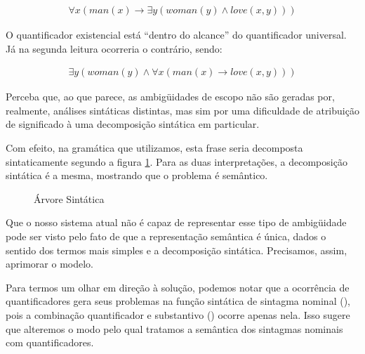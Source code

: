 \begin{align*}
\forall x (man(x) \rightarrow \exists y (woman(y) \land love(x,y)))
\end{align*}

O quantificador existencial está ``dentro do alcance'' do quantificador universal. Já na segunda leitura ocorreria o contrário, sendo:

\begin{align*}
\exists y (woman(y) \land \forall x(man(x) \rightarrow love(x,y)))
\end{align*}

Perceba que, ao que parece, as ambigüidades de escopo não são geradas por, realmente, análises sintáticas distintas, mas sim por uma dificuldade de atribuição de significado à uma decomposição sintática em particular.

Com efeito, na gramática que utilizamos, esta frase seria decomposta sintaticamente segundo a figura \ref{tree:syntax}. Para as duas interpretações, a decomposição sintática é a mesma, mostrando que o problema é semântico.

\begin{figure}
\caption{Árvore Sintática}
\label{tree:syntax}
\end{figure}

Que o nosso sistema atual não é capaz de representar esse tipo de ambigüidade pode ser visto pelo fato de que a representação semântica é única, dados o sentido dos termos mais simples e a decomposição sintática. Precisamos, assim, aprimorar o modelo.

Para termos um olhar em direção à solução, podemos notar que a ocorrência de quantificadores gera seus problemas na função sintática de sintagma nominal (), pois a combinação quantificador e substantivo () ocorre apenas nela. Isso sugere que alteremos o modo pelo qual tratamos a semântica dos sintagmas nominais com quantificadores.

